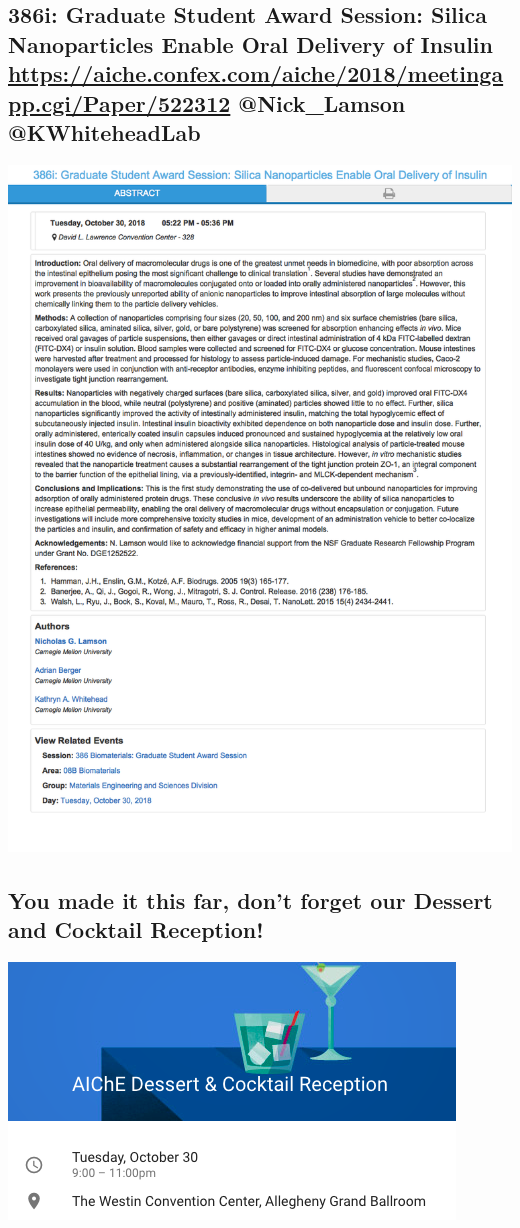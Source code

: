 \documentclass[11pt]{article}
\begin{document}
\subsection{386i: Graduate Student Award Session: Silica Nanoparticles Enable Oral Delivery of Insulin \url{https://aiche.confex.com/aiche/2018/meetingapp.cgi/Paper/522312}  @Nick\_Lamson @KWhiteheadLab}
\label{sec:orgd2514ae}
\begin{center}
\includegraphics[width=.9\linewidth]{./522312.png}
\end{center}

\subsection{You made it this far, don't forget our Dessert and Cocktail Reception!}
\label{sec:org71d217f}

\begin{center}
\includegraphics[width=.9\linewidth]{./screenshots/date-21-10-2018-time-09-24-32.png}
\end{center}
\end{document}
